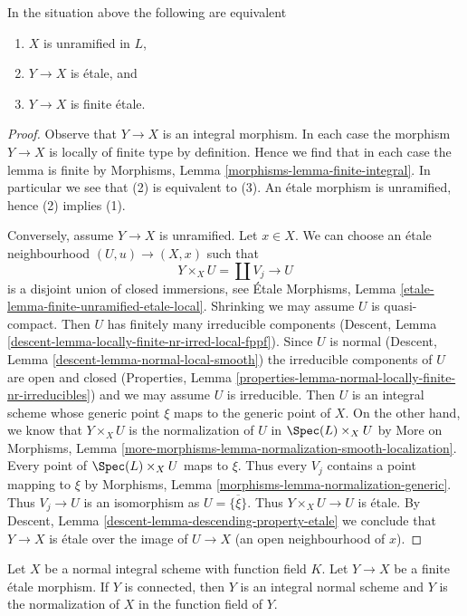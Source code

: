 \begin{lemma}
\label{lemma-unramified-in-L}
In the situation above the following are equivalent
\begin{enumerate}
\item $X$ is unramified in $L$,
\item $Y \to X$ is \'etale, and
\item $Y \to X$ is finite \'etale.
\end{enumerate}
\end{lemma}

\begin{proof}
Observe that $Y \to X$ is an integral morphism.
In each case the morphism $Y \to X$ is locally of finite type
by definition.
Hence we find that in each case the lemma is finite by
Morphisms, Lemma \ref{morphisms-lemma-finite-integral}.
In particular we see that (2) is equivalent to (3).
An \'etale morphism is unramified, hence (2) implies (1).

\medskip\noindent
Conversely, assume $Y \to X$ is unramified. Let $x \in X$.
We can choose an \'etale neighbourhood $(U, u) \to (X, x)$ such that
$$
Y \times_X U = \coprod V_j \longrightarrow U
$$
is a disjoint union of closed immersions, see
\'Etale Morphisms, Lemma \ref{etale-lemma-finite-unramified-etale-local}.
Shrinking we may assume $U$ is quasi-compact.
Then $U$ has finitely many irreducible components
(Descent, Lemma \ref{descent-lemma-locally-finite-nr-irred-local-fppf}).
Since $U$ is normal
(Descent, Lemma \ref{descent-lemma-normal-local-smooth}) the
irreducible components of $U$ are open and closed
(Properties, Lemma \ref{properties-lemma-normal-locally-finite-nr-irreducibles})
and we may assume $U$ is irreducible. Then $U$ is an integral
scheme whose generic point $\xi$ maps to the generic point of $X$.
On the other hand, we know that $Y \times_X U$
is the normalization of $U$ in $\Spec(L) \times_X U$
by More on Morphisms, Lemma
\ref{more-morphisms-lemma-normalization-smooth-localization}.
Every point of $\Spec(L) \times_X U$ maps to $\xi$.
Thus every $V_j$ contains a point mapping to $\xi$ by
Morphisms, Lemma \ref{morphisms-lemma-normalization-generic}.
Thus $V_j \to U$ is an isomorphism as $U = \overline{\{\xi\}}$.
Thus $Y \times_X U \to U$ is \'etale. By
Descent, Lemma \ref{descent-lemma-descending-property-etale}
we conclude that $Y \to X$ is \'etale over the
image of $U \to X$ (an open neighbourhood of $x$).
\end{proof}

\begin{lemma}
\label{lemma-finite-etale-covering-normal-unramified}
Let $X$ be a normal integral scheme with function field $K$.
Let $Y \to X$ be a finite \'etale morphism. If $Y$ is connected,
then $Y$ is an integral normal scheme and $Y$ is the normalization
of $X$ in the function field of $Y$.
\end{lemma}

